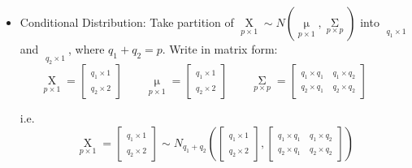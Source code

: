 \begin{itemize}[topsep=6pt,itemsep=4pt]
\begin{itemize}[topsep=6pt,itemsep=4pt]
        
        \end{itemize}
        \item Conditional Distribution: Take partition of $ \mathop{X}\limits_{p\times 1}\sim N(\mathop{\mu}\limits_{p\times 1},\mathop{\Sigma }\limits_{p\times p}) $ into $ \mathop{X_1}\limits_{q_1\times 1} $ and $ \mathop{X_2}\limits_{q_2\times 1}  $, where $ q_1+q_2=p $. Write in matrix form:
        \begin{equation}
            \mathop{X}\limits_{p\times 1}=
            \begin{bmatrix}
                \mathop{X_1}\limits_{q_1\times 1}\\
                \mathop{X_2}\limits_{q_2\times 2}  
            \end{bmatrix}  
            \qquad 
            \mathop{\mu}\limits_{p\times 1}=
            \begin{bmatrix}
                \mathop{\mu_1 }\limits_{q_1\times 1}\\
                \mathop{\mu_2 }\limits_{q_2\times 2}  
            \end{bmatrix}  
            \qquad             
            \mathop{\Sigma }\limits_{p\times p}=
            \begin{bmatrix}
                \mathop{\Sigma_{11} }\limits_{q_1\times q_1}&\mathop{\Sigma_{12} }\limits_{q_1\times q_2} \\
                \mathop{\Sigma_{21} }\limits_{q_2\times q_1}&\mathop{\Sigma_{22} }\limits_{q_2\times q_2}   
            \end{bmatrix}  
            \qquad 
        \end{equation}
        
            i.e. 
        \begin{equation}
            \mathop{X}\limits_{p\times 1}=\begin{bmatrix}
                \mathop{X_1 }\limits_{q_1\times 1}\\
                \mathop{X_2 }\limits_{q_2\times 2}  
            \end{bmatrix}  
            \sim
            N_{q_1+q_2}\left(\begin{bmatrix}
                \mathop{\mu_1 }\limits_{q_1\times 1}\\
                \mathop{\mu_2 }\limits_{q_2\times 2}  
            \end{bmatrix},\begin{bmatrix}
                \mathop{\Sigma_{11} }\limits_{q_1\times q_1}&\mathop{\Sigma_{12} }\limits_{q_1\times q_2} \\
                \mathop{\Sigma_{21} }\limits_{q_2\times q_1}&\mathop{\Sigma_{22} }\limits_{q_2\times q_2}   
            \end{bmatrix}  
                \right)
        \end{equation}
            

\end{itemize}
